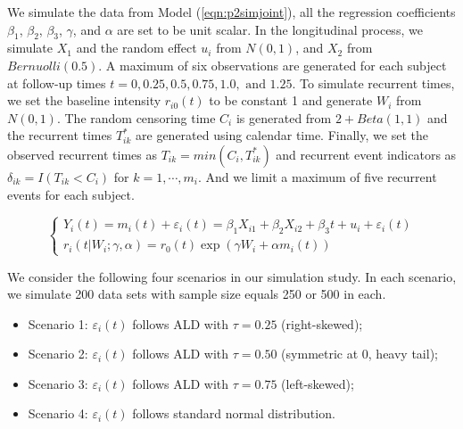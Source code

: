 We simulate the data from Model (\ref{eqn:p2simjoint}), all the regression coefficients $\beta_1$, $\beta_2$, $\beta_3$, $\gamma$, and $\alpha$ are set to be unit scalar. In the longitudinal process, we simulate $X_1$ and the random effect $u_i$ from $N(0, 1)$, and $X_2$ from $Bernuolli(0.5)$. A maximum of six observations are generated for each subject at follow-up times $t=0, 0.25, 0.5, 0.75, 1.0, \mbox{ and }1.25$. To simulate recurrent times, we set the baseline intensity $r_{i0}(t)$ to be constant 1 and generate $W_i$ from $N(0, 1)$. The random censoring time $C_i$ is generated from $2+Beta(1,1)$ and the recurrent times $T_{ik}^*$ are generated using calendar time. Finally, we set the observed recurrent times as $T_{ik} = min(C_i, T_{ik}^*)$ and recurrent event indicators as $\delta_{ik} = I(T_{ik} < C_i)$ for $k=1, \cdots, m_i$. And we limit a maximum of five recurrent events for each subject.


\begin{equation}\label{eqn:p2simjoint}
\left\{
\begin{array}{l}
Y_{i}(t) = m_i(t) + \varepsilon_{i}(t) = \beta_1X_{i1} + \beta_2X_{i2} + \beta_3t + u_i + \varepsilon_{i}(t)\\
r_i(t|W_i;  \gamma, \alpha) = r_0(t)\exp(\gamma W_i + \alpha m_i(t))
\end{array}
\right.
\end{equation}


We consider the following four scenarios in our simulation study. In each scenario, we simulate 200 data sets with sample size equals 250 or 500 in each.
\begin{itemize}
\item Scenario 1: $\varepsilon_{i}(t)$ follows ALD with $\tau=0.25$ (right-skewed);
\item Scenario 2: $\varepsilon_{i}(t)$ follows ALD with $\tau=0.50$ (symmetric at 0, heavy tail);
\item Scenario 3: $\varepsilon_{i}(t)$ follows ALD with $\tau=0.75$ (left-skewed);
\item Scenario 4: $\varepsilon_{i}(t)$ follows standard normal distribution.
\end{itemize}

